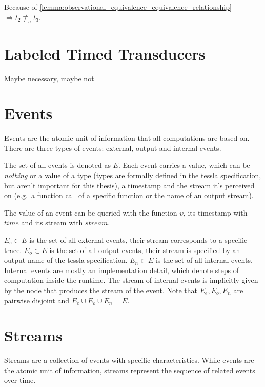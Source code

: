\begin{exmp}[name=Observational Equivalence]
  Because of \cref{lemma:observational_equivalence_equivalence_relationship} \(\Rightarrow t_2 \not\equiv_a t_3\).

\end{exmp}

\section{Labeled Timed Transducers}
Maybe necessary, maybe not

\section{Events}
\label{sec:definitions:events}

Events are the atomic unit of information that all computations are based on.
There are three types of events: external, output and internal events.

The set of all events is denoted as \(E\).
Each event carries a value, which can be \emph{nothing} or a value of a type (types are formally defined in the \gls{tessla} specification, but aren't important for this thesis), a timestamp and the stream it's perceived on (e.g.\ a function call of a specific function or the name of an output stream).

The value of an event can be queried with the function \(\upsilon\), its timestamp with \(\mathit{time}\) and its stream with \(\mathit{stream}\).

\(E_e \subset E\) is the set of all external events, their stream corresponds to a specific trace.
\(E_o \subset E\) is the set of all output events, their stream is specified by an output name of the \gls{tessla} specification.
\(E_n \subset E\) is the set of all internal events.
Internal events are mostly an implementation detail, which denote steps of computation inside the runtime.
The stream of internal events is implicitly given by the node that produces the stream of the event.
Note that \(E_e, E_o, E_n\) are pairwise disjoint and \(E_e \cup E_o \cup E_n = E\).

\section{Streams}
\label{sec:definitions:streams}

Streams are a collection of events with specific characteristics.
While events are the atomic unit of information, streams represent the sequence of related events over time.


